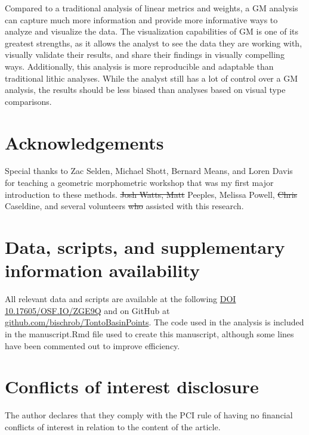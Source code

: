 \documentclass[a4paper]{article}
\providecommand{\DIFadd}[1]{{\protect\color{blue}\uwave{#1}}} %
\providecommand{\DIFdel}[1]{{\protect\color{red}\sout{#1}}}                      %
\providecommand{\DIFaddbegin}{} %
\providecommand{\DIFaddend}{} %
\providecommand{\DIFdelbegin}{} %
\providecommand{\DIFdelend}{} %
\begin{document}
Compared to a traditional analysis of linear metrics and weights, a GM analysis can capture much more information and provide more informative ways to analyze and visualize the data. The visualization capabilities of GM is one of its greatest strengths, as it allows the analyst to see the data they are working with, visually validate their results, and share their findings in visually compelling ways. Additionally, this analysis is more reproducible and adaptable than traditional lithic analyses. While the analyst still has a lot of control over a GM analysis, the results should be less biased than analyses based on visual type comparisons.

\hypertarget{acknowledgements}{%
\section*{Acknowledgements}\label{acknowledgements}}

Special thanks to Zac Selden, Michael Shott, Bernard Means, and Loren Davis for teaching a geometric morphometric workshop that was my first major introduction to these methods. \DIFdelbegin \DIFdel{Josh Watts, Matt }\DIFdelend \DIFaddbegin \DIFadd{Joshua Watts, Matthew }\DIFaddend Peeples, Melissa Powell, \DIFdelbegin \DIFdel{Chris }\DIFdelend \DIFaddbegin \DIFadd{Christopher }\DIFaddend Caseldine, and several volunteers \DIFdelbegin \DIFdel{who }\DIFdelend assisted with this research.

\hypertarget{data-scripts-and-supplementary-information-availability}{%
\section*{Data, scripts, and supplementary information availability}\label{data-scripts-and-supplementary-information-availability}}

All relevant data and scripts are available at the following \href{https://osf.io/zge9q/}{DOI 10.17605/OSF.IO/ZGE9Q} and on GitHub at \href{https://github.com/bischrob/TontoBasinPoints}{github.com/bischrob/TontoBasinPoints}. The \DIFaddbegin \DIFadd{R }\DIFaddend code used in the analysis is included in the manuscript.Rmd file used to create this manuscript, although some lines have been commented out to improve efficiency.

\hypertarget{conflicts-of-interest-disclosure}{%
\section*{Conflicts of interest disclosure}\label{conflicts-of-interest-disclosure}}

The author declares that they comply with the PCI rule of having no financial conflicts of interest in relation to the content of the article.

\nocite{Oliver1997-lk}

\printbibliography[notcategory=ignore]              %
\end{document}
